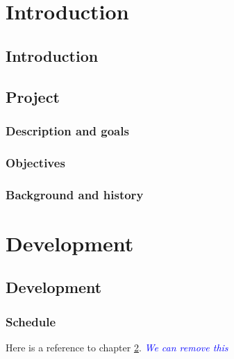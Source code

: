 \documentclass[BSP,english,oneside]{classes/gucthesis}
\newcommand{\comment}[1]{\textcolor{blue}{\emph{#1}}}
\begin{document}


\makefrontpages



\tableofcontents
\listoffigures
\listoftables

\part{Introduction}
	
	\chapter{Introduction}
	\label{chap:introduction}
	

	\chapter{Project}
		\label{chap:project}

		\section{Description and goals}
		

		\section{Objectives}
		

		\section{Background and history}
		

\part{Development}

	\chapter{Development}
		\label{chap:development}

		\section{Schedule}
		
		Here is a reference to chapter \ref{chap:project}. \comment{We can remove this}
\end{document}
